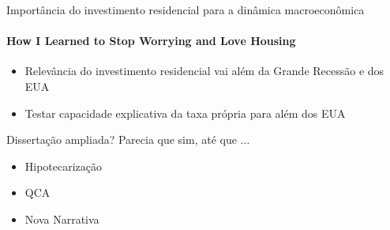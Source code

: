 \begin{frame}{Importância do investimento residencial para a dinâmica macroeconômica}
\framesubtitle{How I Learned to Stop Worrying and Love Housing}
    
\begin{itemize}
    \item Relevância do investimento residencial vai além da Grande Recessão e dos EUA
    \item Testar capacidade explicativa da taxa própria para além dos EUA
\end{itemize}

\begin{alert}{Dissertação ampliada? Parecia que sim, até que $\ldots$}
    \begin{itemize}
        \item Hipotecarização
        \item QCA
        \item Nova Narrativa
    \end{itemize}
\end{alert}
    
\end{frame}
